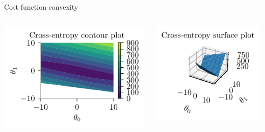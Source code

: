 \documentclass{beamer}
\begin{document}
\begin{frame}{Cost function convexity}
\begin{columns}
	\begin{column}{0.5\textwidth}
		\includegraphics[scale=0.7]{../assets/logistic-regression/figures/logistic-cross-loss-contour.pdf}
	\end{column}
	\begin{column}{0.5\textwidth}
		\includegraphics[scale=0.7]{../assets/logistic-regression/figures/logistic-cross-loss-surface.pdf}
	\end{column}
\end{columns}
\end{frame}
\end{document}
